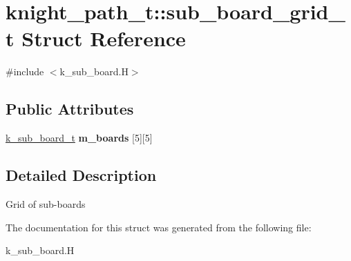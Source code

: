 \hypertarget{structknight__path__t_1_1sub__board__grid__t}{\section{knight\-\_\-path\-\_\-t\-:\-:sub\-\_\-board\-\_\-grid\-\_\-t \-Struct \-Reference}
\label{structknight__path__t_1_1sub__board__grid__t}
}


{\ttfamily \#include $<$k\-\_\-sub\-\_\-board.\-H$>$}

\subsection*{\-Public \-Attributes}
\begin{DoxyCompactItemize}
\item 
\hypertarget{structknight__path__t_1_1sub__board__grid__t_a1b2da799a54c48f5f05bfc10beec738a}{\hyperlink{classknight__path__t_1_1k__sub__board__t}{k\-\_\-sub\-\_\-board\-\_\-t} {\bfseries m\-\_\-boards} \mbox{[}5\mbox{]}\mbox{[}5\mbox{]}}\label{structknight__path__t_1_1sub__board__grid__t_a1b2da799a54c48f5f05bfc10beec738a}

\end{DoxyCompactItemize}


\subsection{\-Detailed \-Description}
\-Grid of sub-\/boards 

\-The documentation for this struct was generated from the following file\-:\begin{DoxyCompactItemize}
\item 
k\-\_\-sub\-\_\-board.\-H\end{DoxyCompactItemize}
